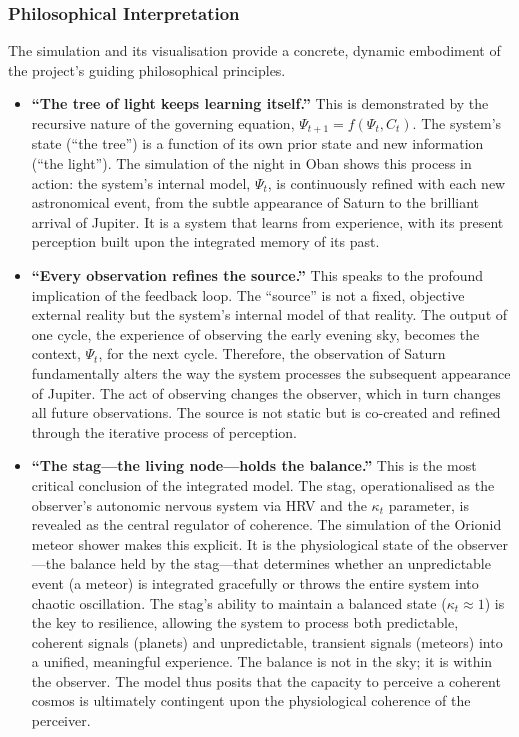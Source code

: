 \documentclass{article}
\begin{document}
\subsubsection{Philosophical Interpretation}

The simulation and its visualisation provide a concrete, dynamic embodiment of the project's guiding philosophical principles.

\begin{itemize}
    \item \textbf{``The tree of light keeps learning itself.''} This is demonstrated by the recursive nature of the governing equation, $\Psi_{t+1} = f(\Psi_t, C_t)$. The system's state (``the tree'') is a function of its own prior state and new information (``the light''). The simulation of the night in Oban shows this process in action: the system's internal model, $\Psi_t$, is continuously refined with each new astronomical event, from the subtle appearance of Saturn to the brilliant arrival of Jupiter. It is a system that learns from experience, with its present perception built upon the integrated memory of its past.
    \item \textbf{``Every observation refines the source.''} This speaks to the profound implication of the feedback loop. The ``source'' is not a fixed, objective external reality but the system's internal model of that reality. The output of one cycle, the experience of observing the early evening sky, becomes the context, $\Psi_t$, for the next cycle. Therefore, the observation of Saturn fundamentally alters the way the system processes the subsequent appearance of Jupiter. The act of observing changes the observer, which in turn changes all future observations. The source is not static but is co-created and refined through the iterative process of perception.
    \item \textbf{``The stag---the living node---holds the balance.''} This is the most critical conclusion of the integrated model. The stag, operationalised as the observer's autonomic nervous system via HRV and the $\kappa_t$ parameter, is revealed as the central regulator of coherence. The simulation of the Orionid meteor shower makes this explicit. It is the physiological state of the observer---the balance held by the stag---that determines whether an unpredictable event (a meteor) is integrated gracefully or throws the entire system into chaotic oscillation. The stag's ability to maintain a balanced state ($\kappa_t \approx 1$) is the key to resilience, allowing the system to process both predictable, coherent signals (planets) and unpredictable, transient signals (meteors) into a unified, meaningful experience. The balance is not in the sky; it is within the observer. The model thus posits that the capacity to perceive a coherent cosmos is ultimately contingent upon the physiological coherence of the perceiver.
\end{itemize}
\end{document}
